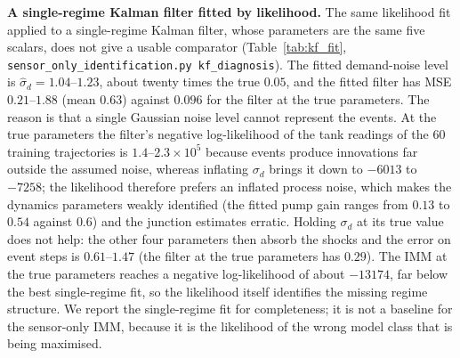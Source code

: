 \documentclass[conference]{IEEEtran}
\begin{document}
\textbf{A single-regime Kalman filter fitted by likelihood.} The same likelihood fit applied to a single-regime Kalman filter, whose parameters are the same five scalars, does not give a usable comparator (Table~\ref{tab:kf_fit}, \texttt{sensor\_only\_identification.py kf\_diagnosis}). The fitted demand-noise level is $\hat\sigma_d=1.04$--$1.23$, about twenty times the true $0.05$, and the fitted filter has MSE $0.21$--$1.88$ (mean $0.63$) against $0.096$ for the filter at the true parameters. The reason is that a single Gaussian noise level cannot represent the events. At the true parameters the filter's negative log-likelihood of the tank readings of the $60$ training trajectories is $1.4$--$2.3\times10^{5}$ because events produce innovations far outside the assumed noise, whereas inflating $\sigma_d$ brings it down to $-6013$ to $-7258$; the likelihood therefore prefers an inflated process noise, which makes the dynamics parameters weakly identified (the fitted pump gain ranges from $0.13$ to $0.54$ against $0.6$) and the junction estimates erratic. Holding $\sigma_d$ at its true value does not help: the other four parameters then absorb the shocks and the error on event steps is $0.61$--$1.47$ (the filter at the true parameters has $0.29$). The IMM at the true parameters reaches a negative log-likelihood of about $-13174$, far below the best single-regime fit, so the likelihood itself identifies the missing regime structure. We report the single-regime fit for completeness; it is not a baseline for the sensor-only IMM, because it is the likelihood of the wrong model class that is being maximised.

\begin{table}[t]
\centering
\caption{Single-regime Kalman filter with parameters fitted by likelihood from the tank readings.}
\label{tab:kf_fit}
\small
\setlength{\tabcolsep}{3pt}
\end{table}
\end{document}
